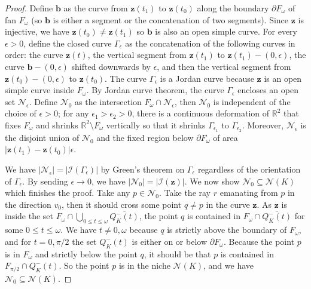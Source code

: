 \begin{proof}
Define \(\mathbf{b}\) as the curve from \(\mathbf{z}(t_1)\) to \(\mathbf{z}(t_0)\) along the boundary \(\partial F_\omega\) of fan \(F_\omega\) (so \(\mathbf{b}\) is either a segment or the concatenation of two segments). Since \(\mathbf{z}\) is injective, we have \(\mathbf{z}(t_0) \neq \mathbf{z}(t_1)\) so \(\mathbf{b}\) is also an open simple curve. For every \(\epsilon > 0\), define the closed curve \(\Gamma_\epsilon\) as the concatenation of the following curves in order: the curve \(\mathbf{z}(t)\), the vertical segment from \(\mathbf{z}(t_1)\) to \(\mathbf{z}(t_1) - (0, \epsilon)\), the curve \(\mathbf{b} - (0, \epsilon)\) shifted downwards by \(\epsilon\), and then the vertical segment from \(\mathbf{z}(t_0) - (0, \epsilon)\) to \(\mathbf{z}(t_0)\). The curve \(\Gamma_{\epsilon}\) is a Jordan curve because \(\mathbf{z}\) is an open simple curve inside \(F_\omega\). By Jordan curve theorem, the curve \(\Gamma_\epsilon\) encloses an open set \(\mathcal{N}_\epsilon\). Define \(\mathcal{N}_0\) as the intersection \(F_{\omega} \cap \mathcal{N}_{\epsilon}\), then \(\mathcal{N}_0\) is independent of the choice of \(\epsilon > 0\); for any \(\epsilon_1 > \epsilon_2 > 0\), there is a continuous deformation of \(\mathbb{R}^2\) that fixes \(F_\omega\) and shrinks \(\mathbb{R}^2 \setminus F_\omega\) vertically so that it shrinks \(\Gamma_{\epsilon_1}\) to \(\Gamma_{\epsilon_2}\). Moreover, \(\mathcal{N}_{\epsilon}\) is the disjoint union of \(\mathcal{N}_0\) and the fixed region below \(\partial F_\omega\) of area \(\left| \mathbf{z}(t_1) - \mathbf{z}(t_0) \right| \epsilon\).

We have \(\left| \mathcal{N}_\epsilon \right| = \left| \mathcal{I}(\Gamma_\epsilon) \right|\) by Green’s theorem on \(\Gamma_\epsilon\) regardless of the orientation of \(\Gamma_\epsilon\). By sending \(\epsilon \to 0\), we have \(\left| \mathcal{N}_0 \right| = \left| \mathcal{I}(\mathbf{z}) \right|\). We now show \(\mathcal{N}_0 \subseteq \mathcal{N}(K)\) which finishes the proof. Take any \(p \in \mathcal{N}_0\). Take the ray \(r\) emanating from \(p\) in the direction \(v_0\), then it should cross some point \(q \neq p\) in the curve \(\mathbf{z}\). As \(\mathbf{z}\) is inside the set \(F_{\omega} \cap \bigcup_{0 \leq t \leq \omega} \overline{Q^-_K(t)}\), the point \(q\) is contained in \(F_{\omega} \cap \overline{Q_K^-(t)}\) for some \(0 \leq t \leq \omega\). We have \(t \neq 0, \omega\) because \(q\) is strictly above the boundary of \(F_\omega\), and for \(t=0, \pi/2\) the set \(Q^-_K(t)\) is either on or below \(\partial F_\omega\). Because the point \(p\) is in \(F_{\omega}\) and strictly below the point \(q\), it should be that \(p\) is contained in \(F_{\pi/2} \cap Q_K^-(t)\). So the point \(p\) is in the niche \(\mathcal{N}(K)\), and we have \(\mathcal{N}_0 \subseteq \mathcal{N}(K)\).
\end{proof}

